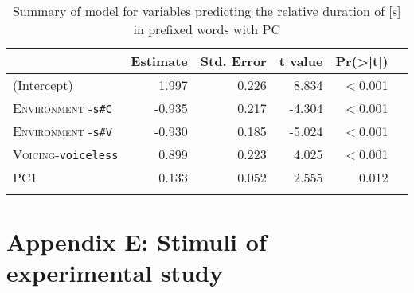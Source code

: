 \begin{table}
	
	\caption{ Summary of model for variables predicting the relative duration of [s] in prefixed words with PC}
	\label{model dis PC Corpus rel}

	\begin{tabular}{lrrrrr}
				\lsptoprule
		& Estimate                       & Std. Error            & t value & Pr(\textgreater|t|)  \\ \midrule
(Intercept) & 1.997 & 0.226 & 8.834 & $<$0.001  \\ 
\textsc{Environment} -\texttt{s\#C}  & -0.935 & 0.217 & -4.304 &$<$0.001  \\ 
\textsc{Environment} -\texttt{s\#V} & -0.930 & 0.185 & -5.024 & $<$0.001  \\ 
\textsc{Voicing}-\texttt{voiceless} & 0.899 & 0.223 & 4.025 & $<$0.001 \\ 
\textsc{PC1} & 0.133 & 0.052 & 2.555 & 0.012 \\ 
		\lspbottomrule 
			\end{tabular}
\end{table}


\clearpage

\section*{Appendix E: Stimuli of experimental study} \label{Appendix E: Stimuli of Experimental Study}




